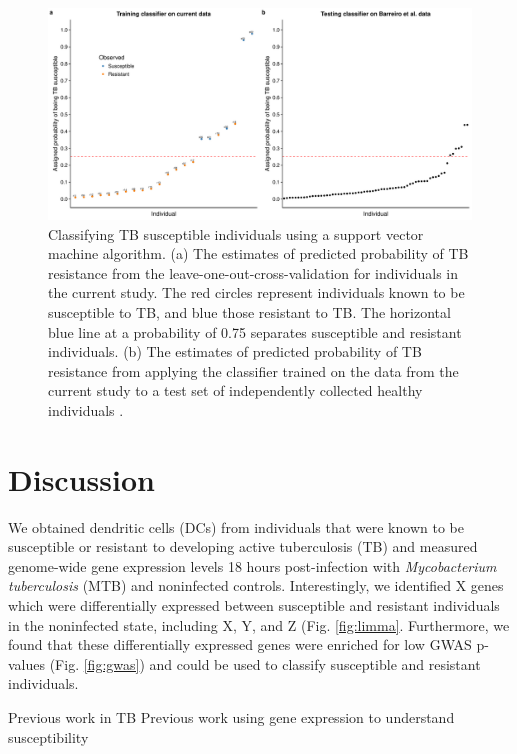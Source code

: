 \documentclass[fleqn,10pt]{wlscirep}
\begin{document}
\begin{figure}[ht]
\centering
\includegraphics[width=\linewidth]{../figure/classifier-svm.pdf}
\caption{
Classifying TB susceptible individuals using a support vector machine
algorithm. (a) The estimates of predicted probability of TB resistance
from the leave-one-out-cross-validation for individuals in the current
study. The red circles represent individuals known to be susceptible
to TB, and blue those resistant to TB. The horizontal blue line at a
probability of 0.75 separates susceptible and resistant individuals.
(b) The estimates of predicted probability of TB resistance from
applying the classifier trained on the data from the current study to
a test set of independently collected healthy individuals
\cite{Barreiro2012}.
}
\label{fig:classifier}
\end{figure}

\section*{Discussion}

We obtained dendritic cells (DCs) from individuals that were known to
be susceptible or resistant to developing active tuberculosis (TB) and
measured genome-wide gene expression levels 18 hours post-infection
with \emph{Mycobacterium tuberculosis} (MTB) and noninfected controls.
Interestingly, we identified X genes which were differentially
expressed between susceptible and resistant individuals in the
noninfected state, including X, Y, and Z (Fig. \ref{fig:limma}.
Furthermore, we found that these differentially expressed genes were
enriched for low GWAS p-values (Fig. \ref{fig:gwas}) and could be used
to classify susceptible and resistant individuals.

Previous work in TB \cite{Thuong2008}
Previous work using gene expression to understand susceptibility
\cite{Bryant2014}
\end{document}
